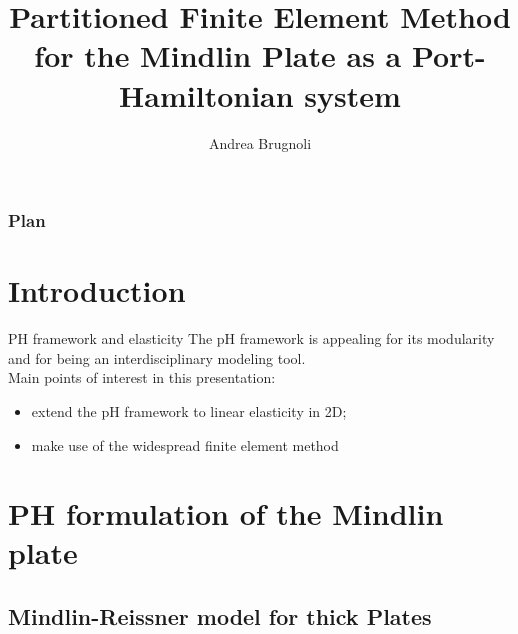 \documentclass{beamer}
\title[CPDE Oaxaca 2019]{Partitioned Finite Element Method for the Mindlin Plate as a Port-Hamiltonian system}
\author[A. Brugnoli ISAE-SUPAERO]{\small Andrea Brugnoli}
\begin{document}
	
\nocite{*}

\begin{frame}
	\titlepage
\end{frame}

\begin{frame}
\frametitle{Plan}
\small
\tableofcontents
\normalsize
\end{frame}

\section{Introduction}

\begin{frame}{PH framework and elasticity}
The pH framework is appealing for its modularity and for being an interdisciplinary modeling tool. \\ 
Main points of interest in this presentation:
\begin{itemize}
\item extend the pH framework to linear elasticity in 2D;
\item make use of the widespread finite element method\,  \, 
\end{itemize}

\end{frame}

\section{PH formulation of the Mindlin plate}
\subsection{Mindlin-Reissner model for thick Plates}
\end{document}
